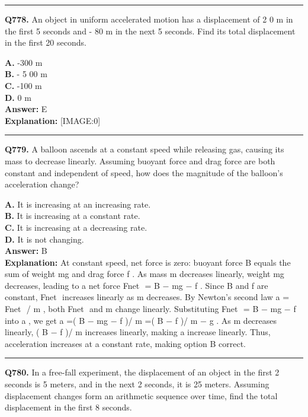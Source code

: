 \documentclass[12pt]{article}
\begin{document}
\hrule
\vspace{1em}


\noindent
\textbf{Q778.} An object in uniform accelerated motion has a displacement of 2
0
m in the first 5 seconds and -
80
m in the next 5 seconds. Find its total displacement in the first 20 seconds.



\textbf{A.} -300 m \\
\textbf{B.} -
5
00 m \\
\textbf{C.} -100 m \\
\textbf{D.} 0 m \\

\textbf{Answer:} E \\
\textbf{Explanation:} [IMAGE:0]

\hrule
\vspace{1em}


\noindent
\textbf{Q779.} A balloon ascends at a constant speed while releasing gas, causing its mass to decrease linearly. Assuming buoyant force and drag force are both constant and independent of speed, how does the magnitude of the balloon’s acceleration change?



\textbf{A.} It is increasing at an increasing rate. \\
\textbf{B.} It is increasing at a constant rate. \\
\textbf{C.} It is increasing at a decreasing rate. \\
\textbf{D.} It is not changing. \\

\textbf{Answer:} B \\
\textbf{Explanation:} At constant speed, net force is zero: buoyant force
B
equals the sum of weight
mg
and drag force
f
. As mass
m
decreases linearly, weight
mg
decreases, leading to a net force
Fnet
​
=
B
−
mg
−
f
. Since
B
and
f
are constant,
Fnet
​
increases linearly as
m
decreases. By Newton’s second law
a
=
Fnet
​
/
m
, both
Fnet
​
and
m
change linearly. Substituting
Fnet
​
=
B
−
mg
−
f
into
a
, we get
a
=(
B
−
mg
−
f
)/
m
=(
B
−
f
)/
m
−
g
. As
m
decreases linearly, (
B
−
f
)/
m
increases linearly, making
a
increase linearly. Thus, acceleration increases at a constant rate, making option B correct.

\hrule
\vspace{1em}


\noindent
\textbf{Q780.} In a free-fall experiment, the displacement of an object in the first 2 seconds is
5
meters, and in the next 2 seconds, it is
25
meters. Assuming displacement changes form an arithmetic sequence over time, find the total displacement in the first 8 seconds.
\end{document}
